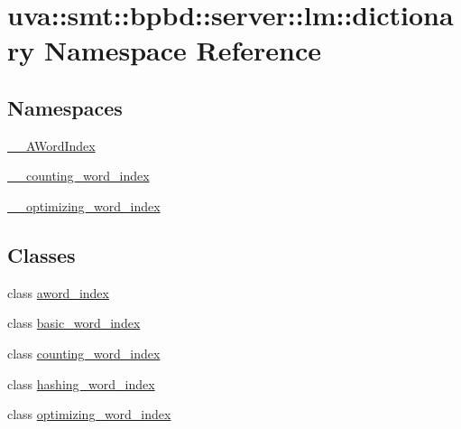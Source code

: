 \hypertarget{namespaceuva_1_1smt_1_1bpbd_1_1server_1_1lm_1_1dictionary}{}\section{uva\+:\+:smt\+:\+:bpbd\+:\+:server\+:\+:lm\+:\+:dictionary Namespace Reference}
\label{namespaceuva_1_1smt_1_1bpbd_1_1server_1_1lm_1_1dictionary}
\subsection*{Namespaces}
\begin{DoxyCompactItemize}
\item 
 \hyperlink{namespaceuva_1_1smt_1_1bpbd_1_1server_1_1lm_1_1dictionary_1_1_____a_word_index}{\+\_\+\+\_\+\+A\+Word\+Index}
\item 
 \hyperlink{namespaceuva_1_1smt_1_1bpbd_1_1server_1_1lm_1_1dictionary_1_1____counting__word__index}{\+\_\+\+\_\+counting\+\_\+word\+\_\+index}
\item 
 \hyperlink{namespaceuva_1_1smt_1_1bpbd_1_1server_1_1lm_1_1dictionary_1_1____optimizing__word__index}{\+\_\+\+\_\+optimizing\+\_\+word\+\_\+index}
\end{DoxyCompactItemize}
\subsection*{Classes}
\begin{DoxyCompactItemize}
\item 
class \hyperlink{classuva_1_1smt_1_1bpbd_1_1server_1_1lm_1_1dictionary_1_1aword__index}{aword\+\_\+index}
\item 
class \hyperlink{classuva_1_1smt_1_1bpbd_1_1server_1_1lm_1_1dictionary_1_1basic__word__index}{basic\+\_\+word\+\_\+index}
\item 
class \hyperlink{classuva_1_1smt_1_1bpbd_1_1server_1_1lm_1_1dictionary_1_1counting__word__index}{counting\+\_\+word\+\_\+index}
\item 
class \hyperlink{classuva_1_1smt_1_1bpbd_1_1server_1_1lm_1_1dictionary_1_1hashing__word__index}{hashing\+\_\+word\+\_\+index}
\item 
class \hyperlink{classuva_1_1smt_1_1bpbd_1_1server_1_1lm_1_1dictionary_1_1optimizing__word__index}{optimizing\+\_\+word\+\_\+index}
\end{DoxyCompactItemize}
